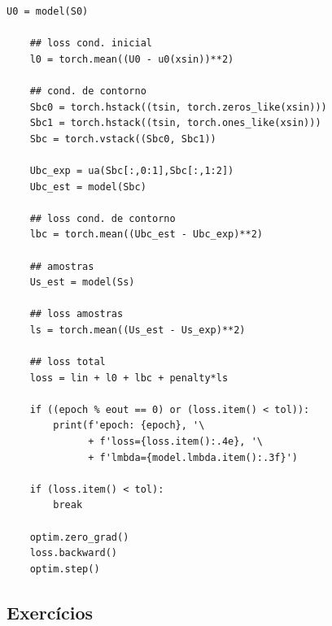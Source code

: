 \begin{ex}
\begin{lstlisting}[caption=ex\_pinn\_fisher.py]
    U0 = model(S0)

    ## loss cond. inicial
    l0 = torch.mean((U0 - u0(xsin))**2)

    ## cond. de contorno
    Sbc0 = torch.hstack((tsin, torch.zeros_like(xsin)))
    Sbc1 = torch.hstack((tsin, torch.ones_like(xsin)))
    Sbc = torch.vstack((Sbc0, Sbc1))

    Ubc_exp = ua(Sbc[:,0:1],Sbc[:,1:2])
    Ubc_est = model(Sbc)

    ## loss cond. de contorno    
    lbc = torch.mean((Ubc_est - Ubc_exp)**2)

    ## amostras
    Us_est = model(Ss)

    ## loss amostras
    ls = torch.mean((Us_est - Us_exp)**2)

    ## loss total
    loss = lin + l0 + lbc + penalty*ls 

    if ((epoch % eout == 0) or (loss.item() < tol)):
        print(f'epoch: {epoch}, '\
              + f'loss={loss.item():.4e}, '\
              + f'lmbda={model.lmbda.item():.3f}')
    
    if (loss.item() < tol):
        break
        
    optim.zero_grad()
    loss.backward()
    optim.step()  
\end{lstlisting}
\end{ex}

\subsection{Exercícios}
\badgeConstrucao